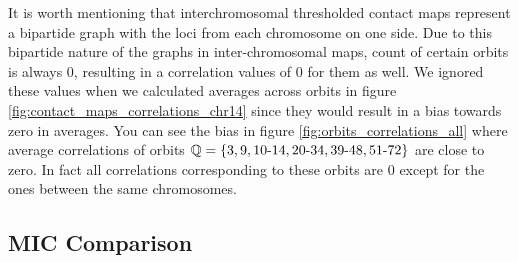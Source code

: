 \documentclass[a4,center,fleqn]{NAR}
\begin{document}
It is worth mentioning that interchromosomal 
thresholded contact maps 
represent
a bipartide graph with the loci from each chromosome 
on one side. Due to this
bipartide nature of the graphs in inter-chromosomal maps,
count of certain orbits is always 0, resulting in
a correlation values of 0 for them as well.
We ignored these values  when we calculated averages across orbits 
in figure \ref{fig:contact_maps_correlations_chr14} since they
would result in a bias towards zero in 
averages. You can see the bias in 
figure \ref{fig:orbits_correlations_all} where 
average correlations of orbits
$\mathbb{Q} = \{3, 9, 10{\text -}14, 20{\text -}34, 39{\text -}48, 51{\text -}72\}$ 
are close to zero. In fact all correlations
corresponding to these orbits are 0 except for the ones between the same 
chromosomes.

\subsection{MIC Comparison}
\end{document}
